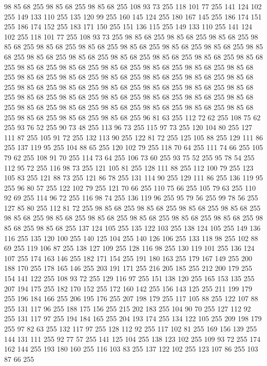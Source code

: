 98 85 68 255 98 85 68 255 98 85 68 255 108 93 73 255 118 101 77 255 141 124 102 255 149 133 110 255 135 120 99 255 160 145 124 255 180 167 145 255 186 174 151 255 186 174 152 255 183 171 150 255 151 136 115 255 149 133 110 255 141 124 102 255 118 101 77 255 108 93 73 255 98 85 68 255 98 85 68 255 98 85 68 255 98 85 68 255 98 85 68 255 98 85 68 255 98 85 68 255 98 85 68 255 98 85 68 255 98 85 68 255 98 85 68 255 98 85 68 255 98 85 68 255 98 85 68 255 98 85 68 255 98 85 68 255 98 85 68 255 98 85 68 255 98 85 68 255 98 85 68 255 98 85 68 255 98 85 68 255 98 85 68 255 98 85 68 255 98 85 68 255 98 85 68 255 98 85 68 255 98 85 68 255 98 85 68 255 98 85 68 255 98 85 68 255 98 85 68 255 98 85 68 255 98 85 68 255 98 85 68 255 98 85 68 255 98 85 68 255 98 85 68 255 98 85 68 255 98 85 68 255 98 85 68 255 98 85 68 255 98 85 68 255 98 85 68 255 98 85 68 255 98 85 68 255
98 85 68 255 98 85 68 255 98 85 68 255 96 81 63 255 112 72 62 255 108 75 62 255 93 76 52 255 90 73 48 255 113 96 73 255 115 97 73 255 120 104 80 255 127 111 87 255 105 91 72 255 132 113 90 255 122 81 72 255 125 105 88 255 129 111 86 255 137 119 95 255 104 88 65 255 120 102 79 255 118 70 64 255 111 74 66 255 105 79 62 255 108 91 70 255 114 73 64 255 106 73 60 255 93 75 52 255 95 78 54 255 112 95 72 255 116 98 73 255 121 105 81 255 128 111 88 255 112 100 79 255 123 105 83 255 121 88 73 255 121 86 78 255 131 114 90 255 129 111 86 255 136 119 95 255 96 80 57 255 122 102 79 255 121 70 66 255 110 75 66 255 105 79 63 255 110 92 69 255 114 96 72 255 116 98 74 255 136 119 96 255 95 79 56 255 99 78 56 255 127 85 80 255 112 81 72 255 98 85 68 255 98 85 68 255 98 85 68 255 98 85 68 255 98 85 68 255 98 85 68 255 98 85 68 255 98 85 68 255 98 85 68 255 98 85 68 255 98 85 68 255 98 85 68 255
137 124 105 255 135 122 103 255 138 124 105 255 149 136 116 255 135 120 100 255 140 125 104 255 140 126 106 255 133 118 98 255 102 88 69 255 119 106 87 255 138 127 109 255 128 116 98 255 130 119 101 255 136 124 107 255 174 163 146 255 182 171 154 255 191 180 163 255 179 167 149 255 200 188 170 255 178 165 146 255 203 191 171 255 216 205 185 255 212 200 179 255 154 141 122 255 108 93 72 255 129 116 97 255 151 138 120 255 165 153 135 255 207 194 175 255 182 170 152 255 172 160 142 255 156 143 125 255 211 199 179 255 196 184 166 255 206 195 176 255 207 198 179 255 117 105 88 255 122 107 88 255 131 117 96 255 188 175 156 255 215 202 183 255 104 90 70 255 127 112 92 255 131 117 97 255 194 184 165 255 204 193 174 255 134 122 105 255 209 198 179 255 97 82 63 255 132 117 97 255 128 112 92 255 117 102 81 255 169 156 139 255 144 131 111 255 92 77 57 255 141 125 104 255 138 123 102 255 109 93 72 255 174 162 144 255 193 180 160 255 116 103 83 255 137 122 102 255 123 107 86 255 103 87 66 255
